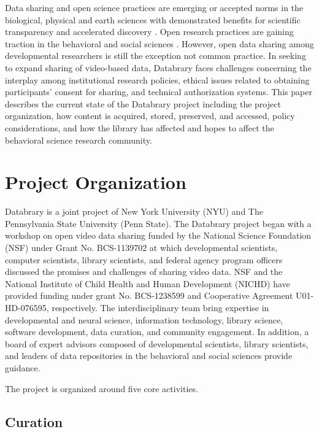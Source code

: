 \documentclass{sig-alternate}
\begin{document}
Data sharing and open science practices are emerging or accepted norms
in the biological, physical and earth sciences with demonstrated
benefits for scientific transparency and accelerated discovery \cite{Curry2011,iedadata,Kaye2009,Overpeck2011}.
Open research practices are gaining traction in the behavioral and
social sciences \cite{Lunshof2014,Adolph2012,King2011,APS2012,Nosek2012i,Nosek2012ii}. However, open data sharing among developmental
researchers is still the exception \cite{MacWhinney2001} not common practice. In seeking
to expand sharing of video-based data, Databrary faces challenges
concerning the interplay among institutional research policies, ethical
issues related to obtaining participants’ consent for sharing, and
technical authorization systems. This paper describes the current state
of the Databrary project including the project organization, how content
is acquired, stored, preserved, and accessed, policy considerations, and
how the library has affected and hopes to affect the behavioral science
research community.

\section{Project Organization}

Databrary is a joint project of New York University (NYU) and The
Pennsylvania State University (Penn State). The Databrary project began
with a workshop on open video data sharing funded by the National
Science Foundation (NSF) under Grant No. BCS-1139702 at which
developmental scientists, computer scientists, library scientists, and
federal agency program officers discussed the promises and challenges of
sharing video data. NSF and the National Institute of Child Health and
Human Development (NICHD) have provided funding under grant No.
BCS-1238599 and Cooperative Agreement U01-HD-076595, respectively. The
interdisciplinary team bring expertise in developmental and neural
science, information technology, library science, software development,
data curation, and community engagement. In addition, a board of expert
advisors composed of developmental scientists, library scientists, and
leaders of data repositories in the behavioral and social sciences
provide guidance.

The project is organized around five core activities.

\subsection{Curation}
\end{document}
